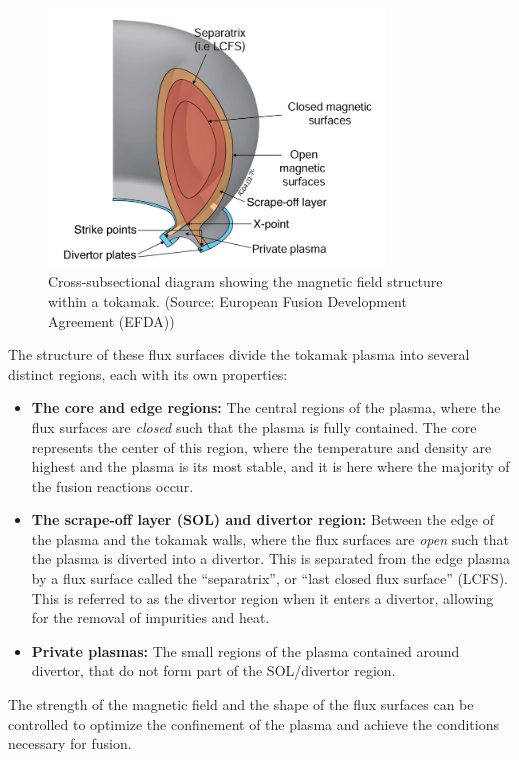     \begin{figure}[!ht]
        \centering
        \includegraphics[width = 0.8\textwidth]{1 - plasmas/3 - tokamaks/images/tokamak structure.png}
        \caption{Cross-subsectional diagram showing the magnetic field structure within a tokamak. (Source: European Fusion Development Agreement (EFDA))}
        \label{fig:tokamak structure}
    \end{figure}

    The structure of these flux surfaces divide the tokamak plasma into several distinct regions, each with its own properties:
    \begin{itemize}
        \item  {\bf The core and edge regions:} The central regions of the plasma, where the flux surfaces are \emph{closed} such that the plasma is fully contained. The core represents the center of this region, where the temperature and density are highest and the plasma is its most stable, and it is here where the majority of the fusion reactions occur.
        \item  {\bf The scrape-off layer (SOL) and divertor region:} Between the edge of the plasma and the tokamak walls, where the flux surfaces are \emph{open} such that the plasma is diverted into a divertor. This is separated from the edge plasma by a flux surface called the ``separatrix'', or ``last closed flux surface'' (LCFS). This is referred to as the divertor region when it enters a divertor, allowing for the removal of impurities and heat.
        \item  {\bf Private plasmas:} The small regions of the plasma contained around divertor, that do not form part of the SOL/divertor region.
    \end{itemize}
    The strength of the magnetic field and the shape of the flux surfaces can be controlled to optimize the confinement of the plasma and achieve the conditions necessary for fusion.
    